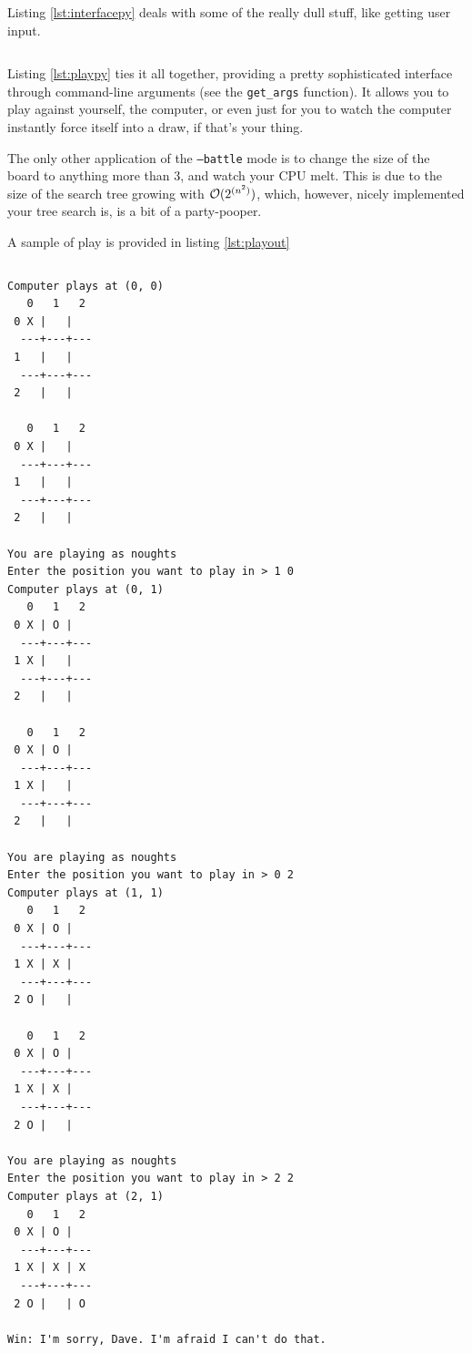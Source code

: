 \documentclass[fleqn,a4paper,11pt]{article}
\begin{document}
    Listing \ref{lst:interfacepy} deals with some of the really dull stuff, like
    getting user input.

\begin{longlisting}
\inputminted{python}{../src/interface.py}
\caption{\texttt{interface.py}: Dealing with user input}
\label{lst:interfacepy}
\end{longlisting}

    Listing \ref{lst:playpy} ties it all together, providing a pretty sophisticated
    interface through command-line arguments (see the \texttt{get\_args}
    function). It allows you to play against yourself, the computer, or even
    just for you to watch the computer instantly force itself into a draw, if
    that's your thing.

    The only other application of the \texttt{--battle} mode is to change the
    size of the board to anything more than 3, and watch your CPU melt. This is
    due to the size of the search tree growing with \(\operatorname{\mathcal O}(2^{(n^2)})\), which,
    however, nicely implemented your tree search is, is a bit of a party-pooper.

    A sample of play is provided in listing \ref{lst:playout}

\begin{longlisting}
\inputminted{python}{../src/play.py}
\caption{\texttt{play.py}: Bringing it all together to play the game}
\label{lst:playpy}
\end{longlisting}

\begin{longlisting}
\begin{verbatim}
Computer plays at (0, 0)
   0   1   2
 0 X |   |   
  ---+---+---
 1   |   |   
  ---+---+---
 2   |   |   

   0   1   2
 0 X |   |   
  ---+---+---
 1   |   |   
  ---+---+---
 2   |   |   

You are playing as noughts
Enter the position you want to play in > 1 0
Computer plays at (0, 1)
   0   1   2
 0 X | O |   
  ---+---+---
 1 X |   |   
  ---+---+---
 2   |   |   

   0   1   2
 0 X | O |   
  ---+---+---
 1 X |   |   
  ---+---+---
 2   |   |   

You are playing as noughts
Enter the position you want to play in > 0 2
Computer plays at (1, 1)
   0   1   2
 0 X | O |   
  ---+---+---
 1 X | X |   
  ---+---+---
 2 O |   |   

   0   1   2
 0 X | O |   
  ---+---+---
 1 X | X |   
  ---+---+---
 2 O |   |   

You are playing as noughts
Enter the position you want to play in > 2 2
Computer plays at (2, 1)
   0   1   2
 0 X | O |   
  ---+---+---
 1 X | X | X 
  ---+---+---
 2 O |   | O 

Win: I'm sorry, Dave. I'm afraid I can't do that.
\end{verbatim}
\caption{Output of \texttt{play.py}}\label{lst:playout}
\end{longlisting}
\end{document}
